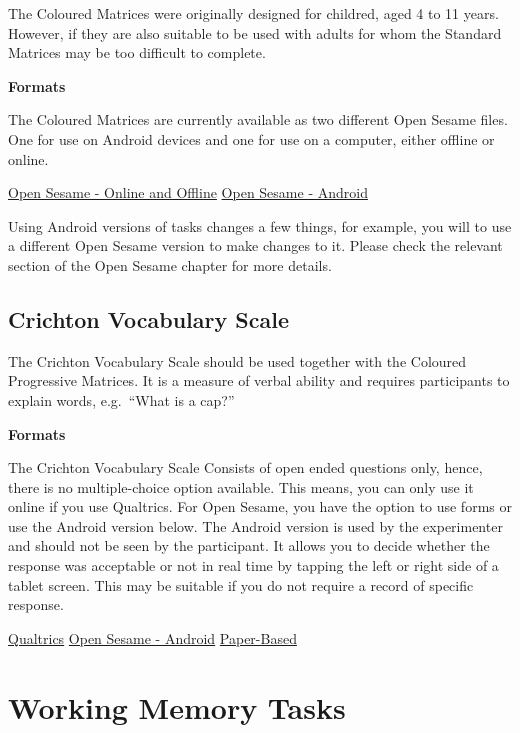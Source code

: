 \documentclass[
]{book}
\begin{document}
The Coloured Matrices were originally designed for childred, aged 4 to 11 years. However, if they are also suitable to be used with adults for whom the Standard Matrices may be too difficult to complete.

\textbf{Formats}

The Coloured Matrices are currently available as two different Open Sesame files. One for use on Android devices and one for use on a computer, either offline or online.

\href{link\%20here}{Open Sesame - Online and Offline} \textbar{} \href{link\%20here}{Open Sesame - Android}

Using Android versions of tasks changes a few things, for example, you will to use a different Open Sesame version to make changes to it. Please check the relevant section of the Open Sesame chapter for more details.

\hypertarget{crichton-vocabulary-scale}{%
\section{Crichton Vocabulary Scale}\label{crichton-vocabulary-scale}}

The Crichton Vocabulary Scale should be used together with the Coloured Progressive Matrices. It is a measure of verbal ability and requires participants to explain words, e.g.~``What is a cap?''

\textbf{Formats}

The Crichton Vocabulary Scale Consists of open ended questions only, hence, there is no multiple-choice option available. This means, you can only use it online if you use Qualtrics. For Open Sesame, you have the option to use forms or use the Android version below.
The Android version is used by the experimenter and should not be seen by the participant. It allows you to decide whether the response was acceptable or not in real time by tapping the left or right side of a tablet screen. This may be suitable if you do not require a record of specific response.

\href{link\%20here}{Qualtrics} \textbar{} \href{link\%20here}{Open Sesame - Android} \textbar{} \href{link\%20here}{Paper-Based}

\hypertarget{working-memory-tasks}{%
\chapter{Working Memory Tasks}\label{working-memory-tasks}}
\end{document}
